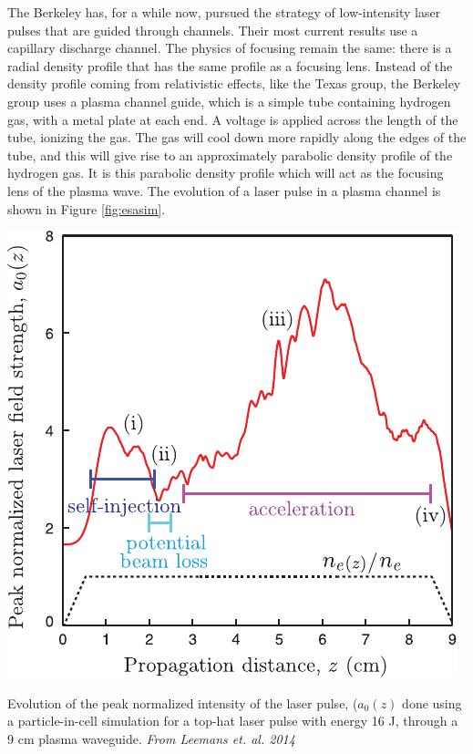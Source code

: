 \documentclass[12pt,letter]{article}
\begin{document}
The Berkeley has, for a while now, pursued the strategy of low-intensity laser
pulses that are guided through channels. Their most current results use a
capillary discharge channel. The physics of focusing remain the same: there is a
radial density profile that has the same profile as a focusing lens. Instead of
the density profile coming from relativistic effects, like the Texas group, the
Berkeley group uses a plasma channel guide, which is a simple tube containing
hydrogen gas, with a metal plate at each end. A voltage is applied across the
length of the tube, ionizing the gas. The gas will cool down more rapidly along
the edges of the tube, and this will give rise to an approximately parabolic
density profile of the hydrogen
gas\cite{PhysRevLett.89.185003,PhysRevE.63.015401}. It is this parabolic density profile which
will act as the focusing lens of the plasma wave. The evolution of a laser pulse
in a plasma channel is shown in Figure \ref{fig:esasim}. 
\begin{marginfigure}
	\includegraphics[width=\marginparwidth]{../figures/esareycapfield.pdf}
    \caption{Evolution of the peak normalized intensity of the laser pulse,
    ($a_0(z)$ done using a particle-in-cell simulation for a top-hat laser pulse
    with energy 16 J, through a 9 \si{cm} plasma waveguide. {\em From Leemans
et. al. 2014 \cite{PhysRevLett.113.245002}}\label{fig:esasim}}
\end{marginfigure}
\end{document}
